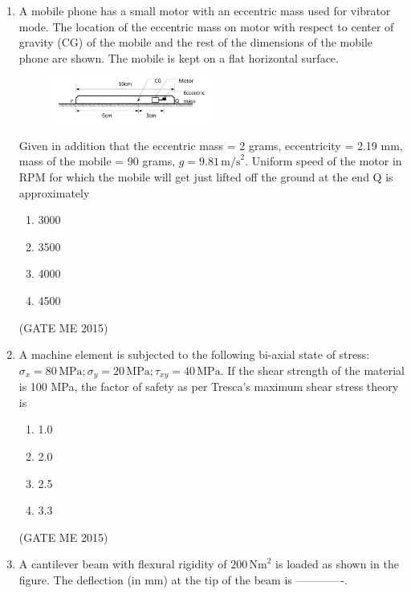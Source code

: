 \documentclass[journal]{IEEEtran}
\begin{document}
\begin{enumerate}
\item A mobile phone has a small motor with an eccentric mass used for vibrator mode. The location of the eccentric mass on motor with respect to center of gravity (CG) of the mobile and the rest of the dimensions of the mobile phone are shown. The mobile is kept on a flat horizontal surface.

\begin{figure}[H]
\centering
\includegraphics[width=0.5\textwidth]{Fig 18.png}
\caption{}
\label{fig:question52}
\end{figure}

Given in addition that the eccentric mass = 2 grams, eccentricity = 2.19 mm, mass of the mobile = 90 grams, $ g = 9.81 \, \text{m/s}^2 $. Uniform speed of the motor in RPM for which the mobile will get just lifted off the ground at the end Q is approximately

\begin{multicols}{4}
\begin{enumerate}
    \item 3000
    \item 3500
    \item 4000
    \item 4500
\end{enumerate}
\end{multicols}
\hfill  (GATE ME 2015)

\item A machine element is subjected to the following bi-axial state of stress: $\sigma_x = 80 \, \text{MPa}; \sigma_y = 20 \, \text{MPa}; \tau_{xy} = 40 \, \text{MPa}$. If the shear strength of the material is 100 MPa, the factor of safety as per Tresca’s maximum shear stress theory is

\begin{multicols}{4}
\begin{enumerate}
    \item 1.0
    \item 2.0
    \item 2.5
    \item 3.3
\end{enumerate}
\end{multicols}
\hfill  (GATE ME 2015)

\item A cantilever beam with flexural rigidity of $200 \, \text{Nm}^2$ is loaded as shown in the figure. The deflection (in mm) at the tip of the beam is -------------.


\end{enumerate}
\end{document}
